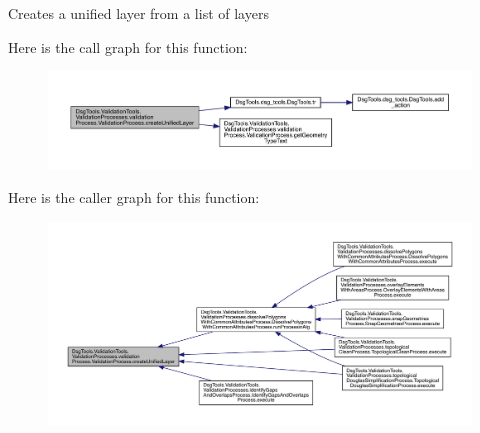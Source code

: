 \begin{DoxyVerb}Creates a unified layer from a list of layers
\end{DoxyVerb}
 Here is the call graph for this function\+:
\nopagebreak
\begin{figure}[H]
\begin{center}
\leavevmode
\includegraphics[width=350pt]{class_dsg_tools_1_1_validation_tools_1_1_validation_processes_1_1validation_process_1_1_validation_process_a2b31d0206a0f7090a2a381811f202120_cgraph}
\end{center}
\end{figure}
Here is the caller graph for this function\+:
\nopagebreak
\begin{figure}[H]
\begin{center}
\leavevmode
\includegraphics[width=350pt]{class_dsg_tools_1_1_validation_tools_1_1_validation_processes_1_1validation_process_1_1_validation_process_a2b31d0206a0f7090a2a381811f202120_icgraph}
\end{center}
\end{figure}
\mbox{\label{class_dsg_tools_1_1_validation_tools_1_1_validation_processes_1_1validation_process_1_1_validation_process_a00ff3f75068b419a9037f8e1284e4433}} 
